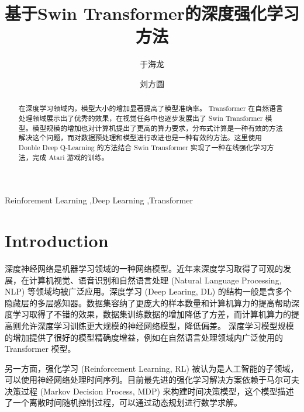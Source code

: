 \documentclass[final,1p,12pt,UTF8,review]{elsarticle}
\begin{document}
\begin{frontmatter}

\title{基于Swin Transformer的深度强化学习方法}

\author[a]{于海龙}

\author[b]{刘方圆}

\begin{abstract}
\par
在深度学习领域内，模型大小的增加显著提高了模型准确率。 Transformer 在自然语言处理领域展示出了优秀的效果，在视觉任务中也逐步发展出了 Swin Transformer 模型。模型规模的增加也对计算机提出了更高的算力要求，分布式计算是一种有效的方法解决这个问题，而对数据预处理和模型进行改进也是一种有效的方法。这里使用 Double Deep Q-Learning 的方法结合 Swin Transformer 实现了一种在线强化学习方法，完成 Atari 游戏的训练。

\end{abstract}



\begin{keyword}
Reinforement Learning \sep Deep Learning \sep Transformer

\end{keyword}

\end{frontmatter}
\newpage
\tableofcontents
\newpage
\section{Introduction}
\par
深度神经网络是机器学习领域的一种网络模型。近年来深度学习取得了可观的发展，在计算机视觉、语音识别和自然语言处理 (Natural Language Processing, NLP) 等领域均被广泛应用。深度学习 (Deep Learing, DL) 的结构一般是含多个隐藏层的多层感知器。数据集容纳了更庞大的样本数量和计算机算力的提高帮助深度学习取得了不错的效果，数据集训练数据的增加降低了方差，而计算机算力的提高则允许深度学习训练更大规模的神经网络模型，降低偏差。%
深度学习模型规模的增加提供了很好的模型精确度增益，例如在自然语言处理领域内广泛使用的 Transformer 模型。%
\par
另一方面，强化学习 (Reinforcement Learning, RL) 被认为是人工智能的子领域，可以使用神经网络处理时间序列。目前最先进的强化学习解决方案依赖于马尔可夫决策过程 (Markov Decision Process, MDP) 来构建时间决策模型，这个模型描述了一个离散时间随机控制过程，可以通过动态规划进行数学求解。
\end{document}
